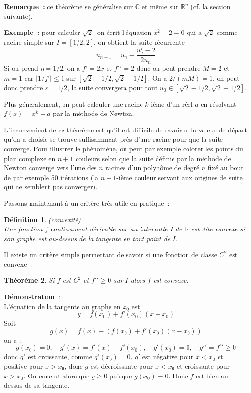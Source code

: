 \documentclass[a4paper,11pt]{article}
\newtheorem{thm}{Théorème}
\newtheorem{defn}[thm]{D\'efinition}
\newcommand{\R}{{\mathbb{R}}}
\newcommand{\C}{{\mathbb{C}}}
\begin{document}
{\bf Remarque~:} ce théorème se généralise sur $\C$ et même sur $\R^n$
(cf. la section suivante).

{\bf Exemple~:} pour calculer $\sqrt{2}$, on écrit l'équation $x^2-2=0$
qui a $\sqrt{2}$ comme racine simple sur $I=[1/2,2]$, 
on obtient la suite récurrente
\[ u_{n+1} = u_n - \frac{u_n^2-2}{2u_n} \]
Si on prend $\eta=1/2$, on a $f'=2x$ et $f'{'}=2$
donc on peut prendre $M=2$ et $m=1$ car $|1/f'|\leq 1$ sur 
$[\sqrt{2}-1/2,\sqrt{2}+1/2]$. On a $2/(mM)=1$, on peut donc 
prendre $\varepsilon=1/2$, la suite convergera pour tout 
$ u_0 \in [\sqrt{2}-1/2,\sqrt{2}+1/2]$.

Plus généralement, on peut calculer une racine $k$-ième d'un réel $a$
en résolvant $f(x)=x^k-a$ par la méthode de Newton.

L'inconvénient de ce th\'eor\`eme
est qu'il est difficile de savoir si la valeur de départ qu'on
a choisie se trouve suffisamment près d'une racine pour que
la suite converge. Pour illustrer le phénomène, 
on peut par exemple colorer les points du plan
complexe en $n+1$ couleurs selon que la suite définie par la méthode
de Newton converge vers l'une des $n$ racines d'un polynôme de degré
$n$ fixé au bout de par exemple 50 itérations (la $n+1$-ième couleur
servant aux origines de suite qui ne semblent pas converger).

Passons maintenant à un critère tr\`es utile en pratique~:
\begin{defn} (convexité)\\
Une fonction $f$ continument dérivable sur un intervalle $I$ de $\R$
est dite convexe si son graphe est au-dessus de la tangente en tout point
de $I$.
\end{defn}
Il existe un crit\`ere simple permettant de savoir si
une fonction de classe $C^2$ est convexe~:
\begin{thm}
Si $f$ est $C^2$ et $f'{'} \geq 0$ sur $I$ alors $f$ est convexe.
\end{thm}
{\bf Démonstration}~:\\
L'équation de la tangente au graphe en $x_0$ est 
\[ y=f(x_0)+f'(x_0)(x-x_0) \]
Soit
\[ g(x)=f(x)-(f(x_0)+f'(x_0)(x-x_0)) \]
on a~:
\[ g(x_0)=0, \quad g'(x)=f'(x)-f'(x_0), \quad g'(x_0)=0, 
\quad g'{'}=f'{'} \geq 0 \]
donc $g'$ est croissante, comme $g'(x_0)=0$, $g'$ est négative
pour $x<x_0$ et positive pour $x>x_0$, donc $g$ est décroissante
pour $x<x_0$ et croissante pour $x>x_0$. On conclut alors que
$g \geq 0$ puisque $g(x_0)=0$. Donc $f$ est bien au-dessus
de sa tangente.
\end{document}
